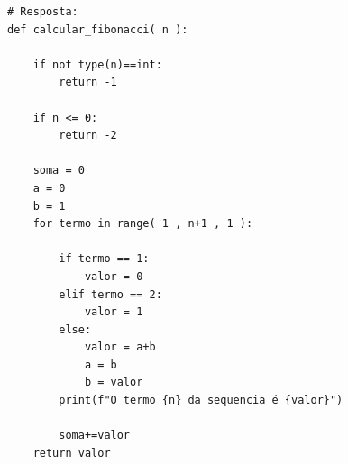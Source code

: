 \ifmostrarGabarito
\begin{verbatim}
# Resposta:
def calcular_fibonacci( n ):

    if not type(n)==int:
        return -1

    if n <= 0:
        return -2

    soma = 0
    a = 0
    b = 1
    for termo in range( 1 , n+1 , 1 ):
        
        if termo == 1:
            valor = 0
        elif termo == 2:
            valor = 1
        else:
            valor = a+b
            a = b
            b = valor
        print(f"O termo {n} da sequencia é {valor}")
            
        soma+=valor
    return valor
\end{verbatim}
\fi
